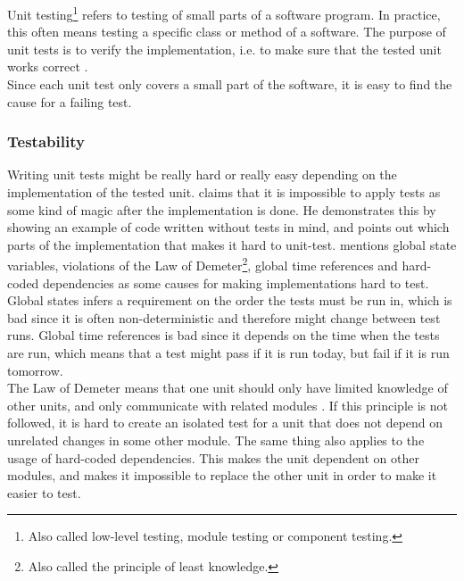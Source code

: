 \MakeShortVerb{\|}


Unit testing\footnote{Also called low-level testing, module testing or
component testing.} refers to testing of small parts of a software
program. In practice, this often means testing a specific class or
method of a software. The purpose of unit tests is to verify the
implementation, i.e. to make sure that the tested unit works correct
\cite{book:pfleeger}.\\

Since each unit test only covers a small part of the software, it is
easy to find the cause for a failing test.\\

\subsubsection{Testability}

Writing unit tests might be really hard or really easy depending on the
implementation of the tested unit. \citet{video:misko_psychology} claims
that it is impossible to apply tests as some kind of magic after the
implementation is done. He demonstrates this by showing an example of
code written without tests in mind, and points out which parts of the
implementation that makes it hard to unit-test.
\citeauthor{video:misko_psychology} mentions global state variables,
violations of the Law of Demeter\footnote{Also called the principle of
least knowledge.}, global time references and hard-coded dependencies as
some causes for making implementations hard to test.\\

Global states infers a requirement on the order the tests
must be run in, which is bad since it is often non-deterministic and
therefore might change between test runs. Global time references is bad
since it depends on the time when the tests are run, which means that a
test might pass if it is run today, but fail if it is run tomorrow.\\

The Law of Demeter means that one unit should only have limited
knowledge of other units, and only communicate with related modules
\cite{wiki:demeter}. If this principle is not followed, it is hard to
create an isolated test for a unit that does not depend on unrelated
changes in some other module. The same thing also applies to the usage
of hard-coded dependencies. This makes the unit dependent on other
modules, and makes it impossible to replace the other unit in order to
make it easier to test.\\

